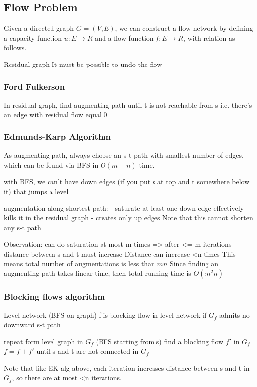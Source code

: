 \subsection{Flow Problem}
Given a directed graph $G=(V, E)$, we can construct a flow network by defining
a capacity function $u: E\rightarrow R$ and a flow function $f: E\rightarrow
R$, with relation as follows.

Residual graph
It must be possible to undo the flow

\subsubsection{Ford Fulkerson}
In residual graph, find augmenting path until t is not reachable from
s i.e. there's an edge with residual flow equal 0

\subsubsection{Edmunds-Karp Algorithm}
As augmenting path, always choose an s-t path with smallest number of edges,
which can be found via BFS in $O(m + n)$ time.

with BFS, we can't have down edges (if you put s at top and t somewhere below it) that jumps a level

augmentation along shortest path:
- saturate at least one down edge effectively kills it in the residual graph
- creates only up edges
Note that this cannot shorten any s-t path

Observation: can do saturation at most m times
=> after <= m iterations distance between s and t must increase
Distance can increase <n times
This means total number of augmentations is less than $mn$
Since finding an augmenting path takes linear time, then total running time is $O(m^2n)$

\subsubsection{Blocking flows algorithm}
Level network (BFS on graph)
f is blocking flow in level network if $G_f$ admits no downward s-t path

repeat
	form level graph in $G_f$ (BFS starting from s)
	find a blocking flow $f'$ in $G_f$
	$f = f + f'$
until s and t are not connected in $G_f$

Note that like EK alg above, each iteration increases distance between s and
t in $G_f$, so there are at most <n iterations.

